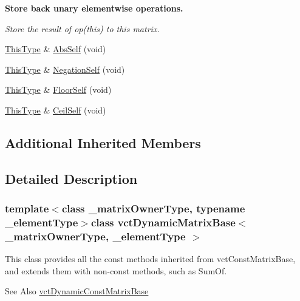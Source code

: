 \begin{Indent}{\bf Store back unary elementwise operations.}\par
{\em Store the result of op(this) to this matrix. }\begin{DoxyCompactItemize}
\item 
\hyperlink{classvct_dynamic_const_matrix_base_ac4ff48cbe4d9de3fdef5a02447ffb9db}{This\-Type} \& \hyperlink{classvct_dynamic_matrix_base_a36435390c3cd0ff8393b9a15991850cd}{Abs\-Self} (void)
\item 
\hyperlink{classvct_dynamic_const_matrix_base_ac4ff48cbe4d9de3fdef5a02447ffb9db}{This\-Type} \& \hyperlink{classvct_dynamic_matrix_base_a699f8b9711f810fbdfdde1b164055696}{Negation\-Self} (void)
\item 
\hyperlink{classvct_dynamic_const_matrix_base_ac4ff48cbe4d9de3fdef5a02447ffb9db}{This\-Type} \& \hyperlink{classvct_dynamic_matrix_base_a32885a796792112d8aadaf5a787c871d}{Floor\-Self} (void)
\item 
\hyperlink{classvct_dynamic_const_matrix_base_ac4ff48cbe4d9de3fdef5a02447ffb9db}{This\-Type} \& \hyperlink{classvct_dynamic_matrix_base_a6f2c0c413c6d3bb2d3b5f19c9f6a1c4c}{Ceil\-Self} (void)
\end{DoxyCompactItemize}
\end{Indent}
\subsection*{Additional Inherited Members}


\subsection{Detailed Description}
\subsubsection*{template$<$class \-\_\-matrix\-Owner\-Type, typename \-\_\-element\-Type$>$class vct\-Dynamic\-Matrix\-Base$<$ \-\_\-matrix\-Owner\-Type, \-\_\-element\-Type $>$}

This class provides all the const methods inherited from vct\-Const\-Matrix\-Base, and extends them with non-\/const methods, such as Sum\-Of.

\begin{DoxySeeAlso}{See Also}
\hyperlink{classvct_dynamic_const_matrix_base}{vct\-Dynamic\-Const\-Matrix\-Base} 
\end{DoxySeeAlso}


